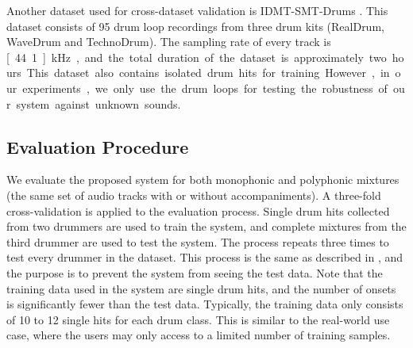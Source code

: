 \documentclass{article}
\begin{document}

Another dataset used for cross-dataset validation is IDMT-SMT-Drums \cite{Dittmar2014}. This dataset consists of 95 drum loop recordings from three drum kits (RealDrum, WaveDrum and TechnoDrum). The sampling rate of every track is \unit[44.1]{kHz}, and the total duration of the dataset is approximately two hours. This dataset also contains isolated drum hits for training. However, in our experiments, we only use the drum loops for testing the robustness of our system against unknown sounds.   

\subsection{Evaluation Procedure}\label{subsec:evaluation procedure}
We evaluate the proposed system for both monophonic and polyphonic mixtures (the same set of audio tracks with or without accompaniments). A three-fold cross-validation is applied to the evaluation process. Single drum hits collected from two drummers are used to train the system, and complete mixtures from the third drummer are used to test the system. The process repeats three times to test every drummer in the dataset. This process is the same as described in \cite{Paulus2009a}, and the purpose is to prevent the system from seeing the test data. Note that the training data used in the system are single drum hits, and the number of onsets is significantly fewer than the test data. Typically, the training data only consists of 10 to 12 single hits for each drum class. This is similar to the real-world use case, where the users may only access to a limited number of training samples. 
\end{document}
